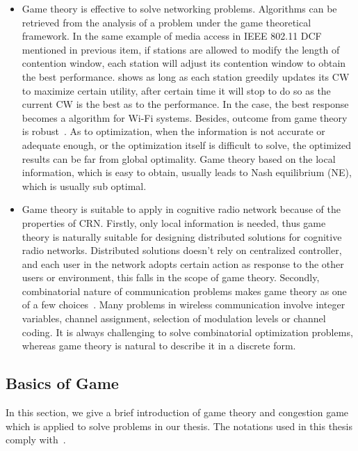\begin{itemize}
\item Game theory is effective to solve networking problems.
Algorithms can be retrieved from the analysis of a problem under the game theoretical framework.
In the same example of media access in IEEE 802.11 DCF mentioned in previous item, if stations are allowed to modify the length of contention window, each station will adjust its contention window to obtain the best performance.
\cite{contentiongame_07} shows as long as each station greedily updates its CW to maximize certain utility, after certain time it will stop to do so as the current CW is the best as to the performance.
In the case, the best response becomes a algorithm for Wi-Fi systems.
%
Besides, outcome from game theory is robust~\cite{Han:2008:RAW:1457343}.
As to optimization, when the information is not accurate or adequate enough, or the optimization itself is difficult to solve, the optimized results can be far from global optimality.
Game theory based on the local information, which is easy to obtain, usually leads to Nash equilibrium (NE), which is usually sub optimal.


\item Game theory is suitable to apply in cognitive radio network because of the properties of CRN.
Firstly, only local information is needed, thus game theory is naturally suitable for designing distributed solutions for cognitive radio networks.
Distributed solutions doesn't rely on centralized controller, and each user in the network adopts certain action as response to the other users or environment, this falls in the scope of game theory.
%
Secondly, combinatorial nature of communication problems makes game theory as one of a few choices~\cite{Han:2008:RAW:1457343}.
Many problems in wireless communication involve integer variables, \ie channel assignment, selection of modulation levels or channel coding.
It is always challenging to solve combinatorial optimization problems, whereas game theory is natural to describe it in a discrete form.

\end{itemize}




 

\subsection{Basics of Game}
In this section, we give a brief introduction of game theory and congestion game which is applied to solve problems in our thesis.
The notations used in this thesis comply with~\cite{agt_book}.


